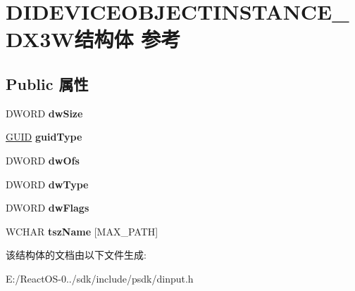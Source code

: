 \hypertarget{struct_d_i_d_e_v_i_c_e_o_b_j_e_c_t_i_n_s_t_a_n_c_e___d_x3_w}{}\section{D\+I\+D\+E\+V\+I\+C\+E\+O\+B\+J\+E\+C\+T\+I\+N\+S\+T\+A\+N\+C\+E\+\_\+\+D\+X3\+W结构体 参考}
\label{struct_d_i_d_e_v_i_c_e_o_b_j_e_c_t_i_n_s_t_a_n_c_e___d_x3_w}
\subsection*{Public 属性}
\begin{DoxyCompactItemize}
\item 
\mbox{\label{struct_d_i_d_e_v_i_c_e_o_b_j_e_c_t_i_n_s_t_a_n_c_e___d_x3_w_a5538637b5f438adc654a96ebf8ae12fa}} 
D\+W\+O\+RD {\bfseries dw\+Size}
\item 
\mbox{\label{struct_d_i_d_e_v_i_c_e_o_b_j_e_c_t_i_n_s_t_a_n_c_e___d_x3_w_a94c5c2d3d83ded4017a022067231b21f}} 
\hyperlink{interface_g_u_i_d}{G\+U\+ID} {\bfseries guid\+Type}
\item 
\mbox{\label{struct_d_i_d_e_v_i_c_e_o_b_j_e_c_t_i_n_s_t_a_n_c_e___d_x3_w_a0d449fb29324f67ea8309b64b2fd6fe8}} 
D\+W\+O\+RD {\bfseries dw\+Ofs}
\item 
\mbox{\label{struct_d_i_d_e_v_i_c_e_o_b_j_e_c_t_i_n_s_t_a_n_c_e___d_x3_w_a896c6388d90b67f03ad692778b1a656a}} 
D\+W\+O\+RD {\bfseries dw\+Type}
\item 
\mbox{\label{struct_d_i_d_e_v_i_c_e_o_b_j_e_c_t_i_n_s_t_a_n_c_e___d_x3_w_a9d2a20a79969cad2677c50c32a59524c}} 
D\+W\+O\+RD {\bfseries dw\+Flags}
\item 
\mbox{\label{struct_d_i_d_e_v_i_c_e_o_b_j_e_c_t_i_n_s_t_a_n_c_e___d_x3_w_a3e711446b2e94f969692278edf981fb6}} 
W\+C\+H\+AR {\bfseries tsz\+Name} \mbox{[}M\+A\+X\+\_\+\+P\+A\+TH\mbox{]}
\end{DoxyCompactItemize}


该结构体的文档由以下文件生成\+:\begin{DoxyCompactItemize}
\item 
E\+:/\+React\+O\+S-\/0../sdk/include/psdk/dinput.\+h\end{DoxyCompactItemize}

